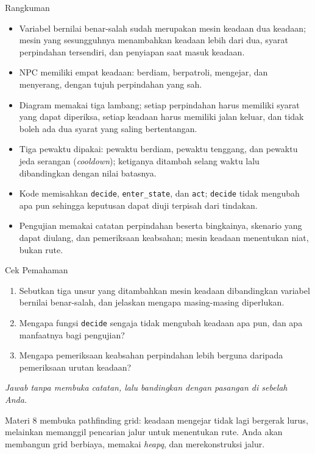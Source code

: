 \documentclass[aspectratio=169,10pt]{beamer}
\begin{document}
\begin{frame}{Rangkuman}
\begin{itemize}
  \item Variabel bernilai benar-salah sudah merupakan mesin keadaan dua
        keadaan; mesin yang sesungguhnya menambahkan keadaan lebih dari dua,
        syarat perpindahan tersendiri, dan penyiapan saat masuk keadaan.
  \item NPC memiliki empat keadaan: berdiam, berpatroli, mengejar, dan
        menyerang, dengan tujuh perpindahan yang sah.
  \item Diagram memakai tiga lambang; setiap perpindahan harus memiliki syarat
        yang dapat diperiksa, setiap keadaan harus memiliki jalan keluar, dan
        tidak boleh ada dua syarat yang saling bertentangan.
  \item Tiga pewaktu dipakai: pewaktu berdiam, pewaktu tenggang, dan pewaktu
        jeda serangan (\emph{cooldown}); ketiganya ditambah selang waktu lalu
        dibandingkan dengan nilai batasnya.
  \item Kode memisahkan \texttt{decide}, \texttt{enter\_state}, dan
        \texttt{act}; \texttt{decide} tidak mengubah apa pun sehingga keputusan
        dapat diuji terpisah dari tindakan.
  \item Pengujian memakai catatan perpindahan beserta bingkainya, skenario yang
        dapat diulang, dan pemeriksaan keabsahan; mesin keadaan menentukan niat,
        bukan rute.
\end{itemize}
\end{frame}

\begin{frame}{Cek Pemahaman}
\begin{enumerate}
  \item Sebutkan tiga unsur yang ditambahkan mesin keadaan dibandingkan variabel
        bernilai benar-salah, dan jelaskan mengapa masing-masing diperlukan.
  \item Mengapa fungsi \texttt{decide} sengaja tidak mengubah keadaan apa pun,
        dan apa manfaatnya bagi pengujian?
  \item Mengapa pemeriksaan keabsahan perpindahan lebih berguna daripada
        pemeriksaan urutan keadaan?
\end{enumerate}
\vspace{0.35cm}
{\footnotesize\color{ubMuted}\itshape Jawab tanpa membuka catatan, lalu
bandingkan dengan pasangan di sebelah Anda.}
\end{frame}

  {Materi 8 membuka pathfinding grid: keadaan mengejar tidak lagi bergerak
   lurus, melainkan memanggil pencarian jalur untuk menentukan rute. Anda akan
   membangun grid berbiaya, memakai \emph{heapq}, dan merekonstruksi jalur.}
\end{document}
